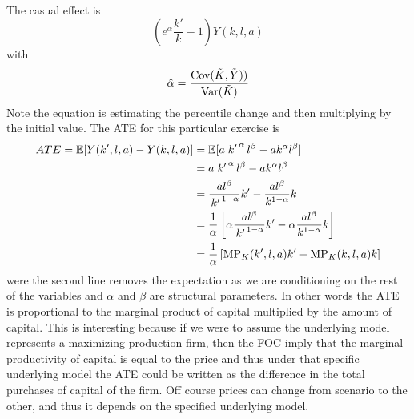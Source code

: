 \documentclass{article}
\begin{document}
\begin{solution}
The casual effect is 
\begin{equation*}
    \left(e^{\hat\alpha}\frac{k'}{k}-1\right)Y(k,l,a)
\end{equation*}
with
\begin{equation*}
    \hat\alpha = \frac{\text{Cov}(\tilde{K},\Tilde{Y}))}{\text{Var}(\tilde{K})}
\end{equation*}
Note the equation is estimating the percentile change and then multiplying by the initial value. The ATE for this particular exercise is 
\begin{align*}
    ATE = \mathbb{E}[Y(k',l,a)-Y(k,l,a)] &= \mathbb{E}[a\left.k'\right.^\alpha l^\beta-ak^\alpha l^\beta] \\ 
    &= a\left.k'\right.^\alpha l^\beta-ak^\alpha l^\beta \\
    &= \frac{al^\beta}{\left.k'\right.^{1-\alpha}}k' - \frac{al^\beta}{k^{1-\alpha}}k \\ 
    &= \frac{1}{\alpha}\left[\alpha\frac{al^\beta}{\left.k'\right.^{1-\alpha}}k' - \alpha\frac{al^\beta}{k^{1-\alpha}}k\right] \\ 
    &= \frac{1}{\alpha}\left[\text{MP}_K(k',l,a)k'-\text{MP}_K(k,l,a)k\right]
\end{align*}
were the second line removes the expectation as we are conditioning on the rest of the variables and $\alpha$ and $\beta$ are structural parameters. In other words the ATE is proportional to the marginal product of capital multiplied by the amount of capital. This is interesting because if we were to assume the underlying model represents a maximizing production firm, then the FOC imply that the marginal productivity of capital is equal to the price and thus under that specific underlying model the ATE could be written as the difference in the total purchases of capital of the firm. Off course prices can change from scenario to the other, and thus it depends on the specified underlying model. 
\end{solution}
\end{document}

